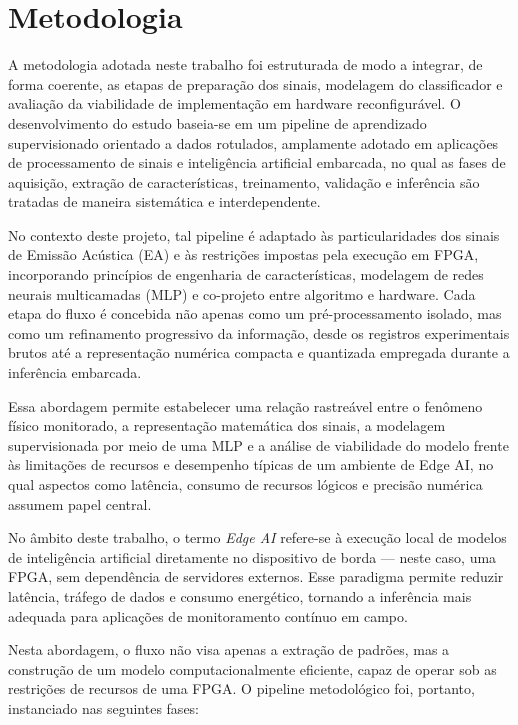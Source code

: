\section{Metodologia}

A metodologia adotada neste trabalho foi estruturada de modo a integrar, de forma coerente, as etapas de preparação dos sinais, modelagem do classificador e avaliação da viabilidade de implementação em hardware reconfigurável. O desenvolvimento do estudo baseia-se em um pipeline de aprendizado supervisionado orientado a dados rotulados, amplamente adotado em aplicações de processamento de sinais e inteligência artificial embarcada, no qual as fases de aquisição, extração de características, treinamento, validação e inferência são tratadas de maneira sistemática e interdependente.

No contexto deste projeto, tal pipeline é adaptado às particularidades dos sinais de Emissão Acústica (EA) e às restrições impostas pela execução em FPGA, incorporando princípios de engenharia de características, modelagem de redes neurais multicamadas (MLP) e co-projeto entre algoritmo e hardware. Cada etapa do fluxo é concebida não apenas como um pré-processamento isolado, mas como um refinamento progressivo da informação, desde os registros experimentais brutos até a representação numérica compacta e quantizada empregada durante a inferência embarcada.

Essa abordagem permite estabelecer uma relação rastreável entre o fenômeno físico monitorado, a representação matemática dos sinais, a modelagem supervisionada por meio de uma MLP e a análise de viabilidade do modelo frente às limitações de recursos e desempenho típicas de um ambiente de Edge AI, no qual aspectos como latência, consumo de recursos lógicos e precisão numérica assumem papel central.

\noindent
No âmbito deste trabalho, o termo \textit{Edge AI} refere-se à execução local de
modelos de inteligência artificial diretamente no dispositivo de borda — neste
caso, uma FPGA, sem dependência de servidores externos. Esse paradigma permite
reduzir latência, tráfego de dados e consumo energético, tornando a inferência
mais adequada para aplicações de monitoramento contínuo em campo.

Nesta abordagem, o fluxo não visa apenas a extração de padrões, mas a construção de um modelo computacionalmente eficiente, capaz de operar sob as restrições de recursos de uma FPGA. O pipeline metodológico foi, portanto, instanciado nas seguintes fases:

